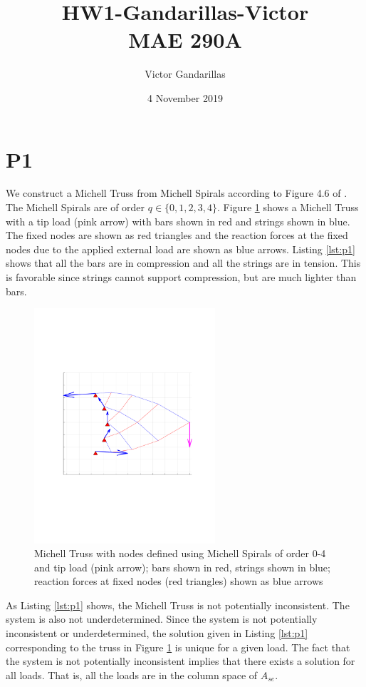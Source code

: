\documentclass{article}
\title{HW1-Gandarillas-Victor\\
MAE 290A}
\author{Victor Gandarillas}
\date{4 November 2019}
\begin{document}
\maketitle

\section{P1}

We construct a Michell Truss from Michell Spirals according to Figure 4.6 of \cite{skelton}.
The Michell Spirals are of order $q\in\{0,1,2,3,4\}$.
Figure \ref{fig:mt} shows a Michell Truss with a tip load (pink arrow) with bars shown in red and strings shown in blue.
The fixed nodes are shown as red triangles and the reaction forces at the fixed nodes due to the applied external load are shown as blue arrows.
Listing \ref{lst:p1} shows that all the bars are in compression and all the strings are in tension.
This is favorable since strings cannot support compression, but are much lighter than bars.

\begin{figure}[H]
  \centering
  \includegraphics[clip, trim=3.5cm 7.5cm 2.5cm 7.5cm, width=0.6\textwidth]{images/michell_tip_load.pdf}
  \caption{Michell Truss with nodes defined using Michell Spirals of order 0-4 and tip load (pink arrow); bars shown in red, strings shown in blue; reaction forces at fixed nodes (red triangles) shown as blue arrows}
  \label{fig:mt}
\end{figure}

As Listing \ref{lst:p1} shows, the Michell Truss is not potentially inconsistent.
The system is also not underdetermined.
Since the system is not potentially inconsistent or underdetermined, the solution given in Listing \ref{lst:p1} corresponding to the truss in Figure \ref{fig:mt} is unique for a given load.
The fact that the system is not potentially inconsistent implies that there exists a solution for all loads.
That is, all the loads are in the column space of $A_{se}$.
\end{document}
